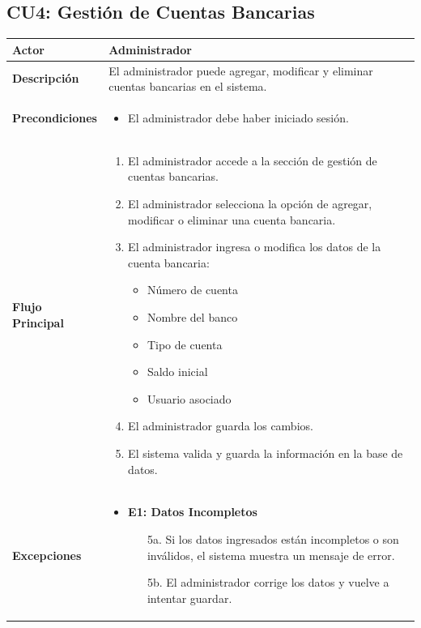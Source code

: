 \documentclass{article}
\begin{document}
\subsection{CU4: Gestión de Cuentas Bancarias}
\begin{longtable}{|l|p{10cm}|}
\hline
\textbf{Actor} & Administrador \\ \hline
\textbf{Descripción} & El administrador puede agregar, modificar y eliminar cuentas bancarias en el sistema. \\ \hline
\textbf{Precondiciones} & 
\begin{itemize}
    \item El administrador debe haber iniciado sesión.
\end{itemize} \\ \hline
\textbf{Flujo Principal} & 
\begin{enumerate}
    \item El administrador accede a la sección de gestión de cuentas bancarias.
    \item El administrador selecciona la opción de agregar, modificar o eliminar una cuenta bancaria.
    \item El administrador ingresa o modifica los datos de la cuenta bancaria:
    \begin{itemize}
        \item Número de cuenta
        \item Nombre del banco
        \item Tipo de cuenta
        \item Saldo inicial
        \item Usuario asociado
    \end{itemize}
    \item El administrador guarda los cambios.
    \item El sistema valida y guarda la información en la base de datos.
\end{enumerate} \\ \hline
\textbf{Excepciones} & 
\begin{itemize}
    \item \textbf{E1: Datos Incompletos}
    \begin{enumerate}
        \item[5a.] Si los datos ingresados están incompletos o son inválidos, el sistema muestra un mensaje de error.
        \item[5b.] El administrador corrige los datos y vuelve a intentar guardar.
    \end{enumerate}

\end{itemize}
\end{longtable}
\end{document}
